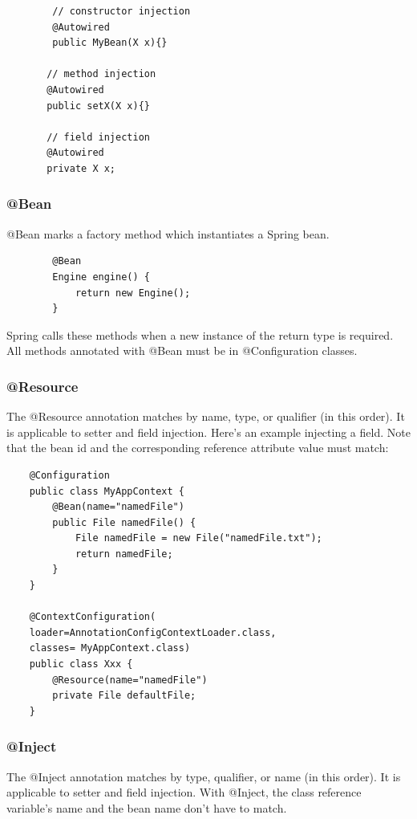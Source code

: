 \documentclass{scrartcl}
\begin{document}
    \begin{lstlisting}
        // constructor injection
        @Autowired
        public MyBean(X x){}

       // method injection
       @Autowired
       public setX(X x){}

       // field injection
       @Autowired
       private X x;
    \end{lstlisting}

\subsubsection{@Bean}

    @Bean marks a factory method which instantiates a Spring bean.

    \begin{lstlisting}
        @Bean
        Engine engine() {
            return new Engine();
        }
    \end{lstlisting}

    Spring calls these methods when a new instance of the return type is required. All methods annotated with @Bean must be in @Configuration classes.


\subsubsection{@Resource}

The @Resource annotation matches by name, type, or qualifier (in this order). It is applicable to setter and field injection.
Here’s an example injecting a field. Note that the bean id and the corresponding reference attribute value must match:

\begin{lstlisting}
    @Configuration
    public class MyAppContext {
        @Bean(name="namedFile")
        public File namedFile() {
            File namedFile = new File("namedFile.txt");
            return namedFile;
        }
    }

    @ContextConfiguration(
    loader=AnnotationConfigContextLoader.class,
    classes= MyAppContext.class)
    public class Xxx {
        @Resource(name="namedFile")
        private File defaultFile;
    }
\end{lstlisting}

\subsubsection{@Inject}

The @Inject annotation matches by type, qualifier, or name (in this order). It is applicable to setter and field injection. With @Inject, the class reference variable's name and the bean name don’t have to match.
\end{document}
